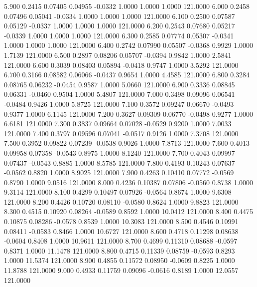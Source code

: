    5.900   0.2415   0.07405   0.04955  -0.0332   1.0000   1.0000   1.0000 121.0000
   6.000   0.2458   0.07496   0.05041  -0.0334   1.0000   1.0000   1.0000 121.0000
   6.100   0.2500   0.07587   0.05129  -0.0337   1.0000   1.0000   1.0000 121.0000
   6.200   0.2543   0.07680   0.05217  -0.0339   1.0000   1.0000   1.0000 121.0000
   6.300   0.2585   0.07774   0.05307  -0.0341   1.0000   1.0000   1.0000 121.0000
   6.400   0.2742   0.07990   0.05507  -0.0368   0.9929   1.0000   1.7139 121.0000
   6.500   0.2897   0.08206   0.05707  -0.0394   0.9842   1.0000   2.5841 121.0000
   6.600   0.3039   0.08403   0.05894  -0.0418   0.9747   1.0000   3.5292 121.0000
   6.700   0.3166   0.08582   0.06066  -0.0437   0.9654   1.0000   4.4585 121.0000
   6.800   0.3284   0.08765   0.06232  -0.0454   0.9587   1.0000   5.0660 121.0000
   6.900   0.3336   0.08845   0.06331  -0.0460   0.9504   1.0000   5.4807 121.0000
   7.000   0.3498   0.09096   0.06541  -0.0484   0.9426   1.0000   5.8725 121.0000
   7.100   0.3572   0.09247   0.06670  -0.0493   0.9377   1.0000   6.1145 121.0000
   7.200   0.3627   0.09309   0.06770  -0.0498   0.9277   1.0000   6.6181 121.0000
   7.300   0.3837   0.09664   0.07028  -0.0529   0.9200   1.0000   7.0033 121.0000
   7.400   0.3797   0.09596   0.07041  -0.0517   0.9126   1.0000   7.3708 121.0000
   7.500   0.3952   0.09822   0.07239  -0.0538   0.9026   1.0000   7.8713 121.0000
   7.600   0.4013   0.09958   0.07358  -0.0543   0.8975   1.0000   8.1240 121.0000
   7.700   0.4043   0.09997   0.07437  -0.0543   0.8885   1.0000   8.5785 121.0000
   7.800   0.4193   0.10243   0.07637  -0.0562   0.8820   1.0000   8.9025 121.0000
   7.900   0.4263   0.10410   0.07772  -0.0569   0.8790   1.0000   9.0516 121.0000
   8.000   0.4236   0.10387   0.07806  -0.0560   0.8738   1.0000   9.3114 121.0000
   8.100   0.4299   0.10497   0.07926  -0.0564   0.8674   1.0000   9.6308 121.0000
   8.200   0.4426   0.10720   0.08110  -0.0580   0.8624   1.0000   9.8823 121.0000
   8.300   0.4515   0.10920   0.08264  -0.0589   0.8592   1.0000  10.0412 121.0000
   8.400   0.4475   0.10875   0.08286  -0.0578   0.8539   1.0000  10.3083 121.0000
   8.500   0.4546   0.10991   0.08411  -0.0583   0.8466   1.0000  10.6727 121.0000
   8.600   0.4718   0.11298   0.08638  -0.0604   0.8408   1.0000  10.9611 121.0000
   8.700   0.4699   0.11310   0.08688  -0.0597   0.8371   1.0000  11.1478 121.0000
   8.800   0.4715   0.11339   0.08759  -0.0593   0.8293   1.0000  11.5374 121.0000
   8.900   0.4855   0.11572   0.08950  -0.0609   0.8225   1.0000  11.8788 121.0000
   9.000   0.4933   0.11759   0.09096  -0.0616   0.8189   1.0000  12.0557 121.0000

